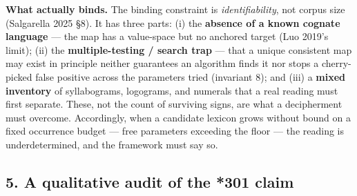 \documentclass[
  10pt,
]{article}
\begin{document}
\textbf{What actually binds.} The binding constraint is
\emph{identifiability}, not corpus size (Salgarella 2025 §8). It has
three parts: (i) the \textbf{absence of a known cognate language} ---
the map has a value-space but no anchored target (Luo 2019's limit);
(ii) the \textbf{multiple-testing / search trap} --- that a unique
consistent map may exist in principle neither guarantees an algorithm
finds it nor stops a cherry-picked false positive across the parameters
tried (invariant 8); and (iii) a \textbf{mixed inventory} of
syllabograms, logograms, and numerals that a real reading must first
separate. These, not the count of surviving signs, are what a
decipherment must overcome. Accordingly, when a candidate lexicon grows
without bound on a fixed occurrence budget --- free parameters exceeding
the floor --- the reading is underdetermined, and the framework must say
so.

\hypertarget{a-qualitative-audit-of-the-301-claim}{%
\subsection{5. A qualitative audit of the *301
claim}\label{a-qualitative-audit-of-the-301-claim}}
\end{document}
